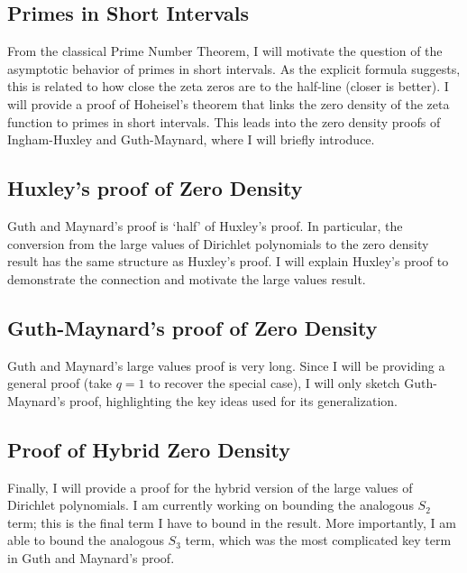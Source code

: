 \documentclass[
ngerman,
toc=flat,
toc=chapterentrywithdots,
captions=tableabove,
listof=entryprefix,
listof=leveldown,
fontsize=12pt,
numbers=noenddot]
{article}
\begin{document}
\subsection{Primes in Short Intervals}
From the classical Prime Number Theorem, I will motivate the question of the asymptotic behavior of primes in short intervals. As the explicit formula suggests, this is related to how close the zeta zeros are to the half-line (closer is better). I will provide a proof of Hoheisel's theorem that links the zero density of the zeta function to primes in short intervals. This leads into the zero density proofs of Ingham-Huxley and Guth-Maynard, where I will briefly introduce.
\subsection{Huxley's proof of Zero Density}
Guth and Maynard's proof is `half' of Huxley's proof. In particular, the conversion from the large values of Dirichlet polynomials to the zero density result has the same structure as Huxley's proof. I will explain Huxley's proof to demonstrate the connection and motivate the large values result. 
\subsection{Guth-Maynard's proof of Zero Density}
Guth and Maynard's large values proof is very long. Since I will be providing a general proof (take $q=1$ to recover the special case), I will only sketch Guth-Maynard's proof, highlighting the key ideas used for its generalization.
\subsection{Proof of Hybrid Zero Density}
Finally, I will provide a proof for the hybrid version of the large values of Dirichlet polynomials. I am currently working on bounding the analogous $S_2$ term; this is the final term I have to bound in the result. More importantly, I am able to bound the analogous $S_3$ term, which was the most complicated key term in Guth and Maynard's proof. 
\end{document}
